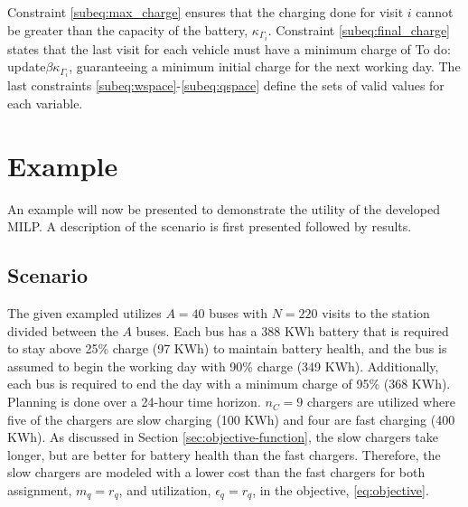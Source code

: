 \documentclass[utf8]{FrontiersinHarvard}
\newcommand{\TODO}[1]{{\color{green} To do: #1}}                                %
\begin{document}

Constraint \eqref{subeq:max_charge} ensures that the charging done for visit $i$ cannot be greater than the capacity of
the battery, $\kappa_{\Gamma_i}$. Constraint \eqref{subeq:final_charge} states that the last visit for each vehicle must have a
minimum charge of \TODO{update}$\beta \kappa_{\Gamma_i}$, guaranteeing a minimum initial charge for the next working day. The last
constraints \eqref{subeq:wspace}-\eqref{subeq:qspace} define the sets of valid values for each variable.

\section{Example}
\label{sec:example}

An example will now be presented to demonstrate the utility of the developed MILP. A description of the scenario is
first presented followed by results.

\subsection{Scenario}
The given exampled utilizes $A = 40$ buses with $N = 220$ visits to the station divided between the $A$ buses. Each bus
has a 388 KWh battery that is required to stay above 25\% charge (97 KWh) to maintain battery health, and the bus is
assumed to begin the working day with 90\% charge (349 KWh). Additionally, each bus is required to end the day with a
minimum charge of 95\% (368 KWh). Planning is done over a 24-hour time horizon. $n_C = 9$ chargers are utilized where five
of the chargers are slow charging (100 KWh) and four are fast charging (400 KWh). As discussed in Section
\ref{sec:objective-function}, the slow chargers take longer, but are better for battery health than the fast chargers.
Therefore, the slow chargers are modeled with a lower cost than the fast chargers for both assignment, $m_q = r_q$, and
utilization, $\epsilon_q = r_q$, in the objective, \eqref{eq:objective}.
\end{document}
